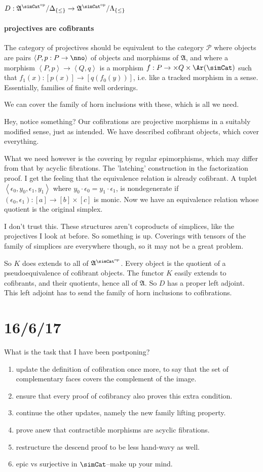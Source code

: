 \documentclass{tac}
\newcommand\cat\mathcal
\newcommand\set[1]{\left\{#1\right\}}
\newcommand\dual{^{\mathrm{op}}}
\newcommand\s{^{\simCat\dual}}
\newcommand\of{:}
\newcommand\simplex\Delta
\newcommand\horn\Lambda
\newcommand\tuplet[1]{\left\langle #1 \right\rangle}
\newcommand\ambient{\mathfrak A}
\begin{document}
$D\of \ambient\s/\simplex_{\set\leq} \to \ambient\s/\horn_{\set\leq}$


\paragraph{projectives are cofibrants}
The category of projectives should be equivalent to the category $\cat P$ where objects are pairs $\tuplet{P,p\of P\to\nno}$ of objects and morphisms of $\ambient$, and where a morphism $\tuplet{P,p}\to \tuplet{Q,q}$ is a morphism $f\of P\to \times Q\times \Ar(\simCat)$ such that $f_1(x)\of [p(x)]\to [q(f_0(y))]$, i.e. like a tracked morphism in a sense.
Essentially, families of finite well orderings.

We can cover the family of horn inclusions with these, which is all we need.

Hey, notice something? Our cofibrations are projective morphisms in a suitably modified sense, just as intended. We have described cofibrant objects, which cover everything.

What we need however is the covering by regular epimorphisms, which may differ from that by acyclic fibrations. The 'latching' construction in the factorization proof. I get the feeling that the equivalence relation is already cofibrant. A tuplet $\tuplet{\epsilon_0,y_0,\epsilon_1,y_1}$ where $y_0\cdot\epsilon_0 = y_1\cdot\epsilon_1$, is nondegenerate if $(\epsilon_0,\epsilon_1)\of [a]\to[b]\times[c]$ is monic. Now we have an equivalence relation whose quotient is the original simplex.

I don't trust this. These structures aren't coproducts of simplices, like the projectives I look at before. So something is up.
Coverings with tensors of the family of simplices are everywhere though, so it may not be a great problem.

So $K$ does extends to all of $\ambient\s$. Every object is the quotient of a pseudoequivalence of cofibrant objects. The functor $K$ easily extends to cofibrants, and their quotients, hence all of $\ambient$. So $D$ has a proper left adjoint. This left adjoint has to send the family of horn inclusions to cofibrations.



\section{16/6/17}
What is the task that I have been postponing?
\begin{enumerate}
\item update the definition of cofibration once more, to say that the set of complementary faces covers the complement of the image.
\item ensure that every proof of cofibrancy also proves this extra condition.
\item continue the other updates, namely the new family lifting property.
\item prove anew that contractible morphisms are acyclic fibrations.
\item restructure the descend proof to be less hand-wavy as well.
\item epic vs surjective in $\simCat$--make up your mind.
\end{enumerate}
\end{document}
